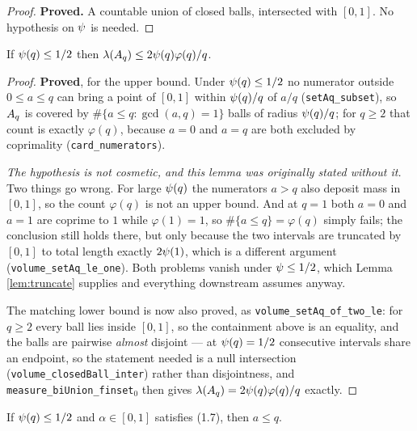 \begin{proof}
  \leanok
  \textbf{Proved.} A countable union of closed balls, intersected with $[0,1]$.
  No hypothesis on $\psi$ is needed.
\end{proof}

\begin{lemma}
  \label{lem:volume-setaq}
  \leanok
  If $\psi(q) \leq 1/2$ then $\lambda(A_q) \leq 2\psi(q)\varphi(q)/q$.
\end{lemma}

\begin{proof}
  \leanok
  \textbf{Proved}, for the upper bound. Under $\psi(q) \leq 1/2$ no numerator outside
  $0 \leq a \leq q$ can bring a point of $[0,1]$ within $\psi(q)/q$ of $a/q$
  (\texttt{setAq\_subset}), so $A_q$ is covered by $\#\{a \le q : \gcd(a,q)=1\}$ balls of
  radius $\psi(q)/q$; for $q \geq 2$ that count is exactly $\varphi(q)$, because $a = 0$
  and $a = q$ are both excluded by coprimality (\texttt{card\_numerators}).

  \emph{The hypothesis is not cosmetic, and this lemma was originally stated without it.}
  Two things go wrong. For large $\psi(q)$ the numerators $a > q$ also deposit mass in
  $[0,1]$, so the count $\varphi(q)$ is not an upper bound. And at $q = 1$ both $a = 0$
  and $a = 1$ are coprime to $1$ while $\varphi(1) = 1$, so $\#\{a \le q\} = \varphi(q)$
  simply fails; the conclusion still holds there, but only because the two intervals are
  truncated by $[0,1]$ to total length exactly $2\psi(1)$, which is a different argument
  (\texttt{volume\_setAq\_le\_one}). Both problems vanish under $\psi \leq 1/2$, which
  Lemma \ref{lem:truncate} supplies and everything downstream assumes anyway.

  The matching lower bound is now also proved, as
  \texttt{volume\_setAq\_of\_two\_le}: for $q \geq 2$ every ball lies inside $[0,1]$, so
  the containment above is an equality, and the balls are pairwise \emph{almost}
  disjoint --- at $\psi(q) = 1/2$ consecutive intervals share an endpoint, so the
  statement needed is a null intersection (\texttt{volume\_closedBall\_inter}) rather
  than disjointness, and \texttt{measure\_biUnion\_finset}$_0$ then gives
  $\lambda(A_q) = 2\psi(q)\varphi(q)/q$ exactly.
\end{proof}

\begin{lemma}
  \label{lem:le-of-approximates}
  \leanok
  If $\psi(q) \leq 1/2$ and $\alpha \in [0,1]$ satisfies (1.7), then $a \leq q$.
\end{lemma}

